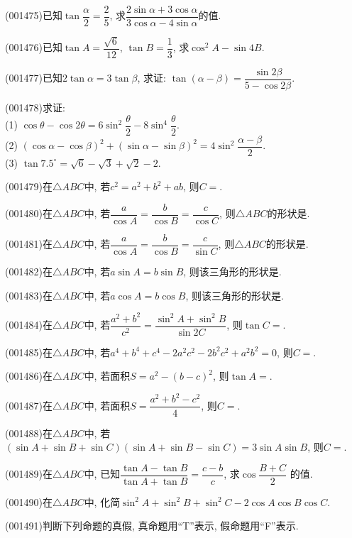 \item (001475)已知$\tan \dfrac{\alpha}{2}=\dfrac{2}{5}$, 求$\dfrac{2\sin\alpha+3\cos\alpha}{3\cos\alpha-4\sin\alpha}$的值.
\item (001476)已知$\tan A=\dfrac{\sqrt{6}}{12}$, $\tan B=\dfrac{1}{3}$, 求$\cos^2 A-\sin 4B$.
\item (001477)已知$2\tan \alpha=3\tan \beta$, 求证: $\tan(\alpha-\beta)=\dfrac{\sin 2\beta}{5-\cos 2\beta}$.
\item (001478)求证:\\ 
(1) $\cos\theta-\cos 2\theta=6\sin^2\dfrac{\theta}{2}-8\sin^4\dfrac{\theta}{2}$.\\ 
(2) $(\cos\alpha-\cos\beta)^2+(\sin\alpha-\sin\beta)^2=4\sin^2\dfrac{\alpha-\beta}{2}$.\\ 
(3) $\tan 7.5^\circ=\sqrt{6}-\sqrt{3}+\sqrt{2}-2$.
\item (001479)在$\triangle ABC$中, 若$c^2=a^2+b^2+ab$, 则$C=$.
\item (001480)在$\triangle ABC$中, 若$\dfrac{a}{\cos A}=\dfrac{b}{\cos B}=\dfrac{c}{\cos C}$, 则$\triangle ABC$的形状是.
\item (001481)在$\triangle ABC$中, 若$\dfrac{a}{\cos A}=\dfrac{b}{\cos B}=\dfrac{c}{\sin C}$, 则$\triangle ABC$的形状是.
\item (001482)在$\triangle ABC$中, 若$a\sin A=b\sin B$, 则该三角形的形状是.
\item (001483)在$\triangle ABC$中, 若$a\cos A=b\cos B$, 则该三角形的形状是.
\item (001484)在$\triangle ABC$中, 若$\dfrac{a^2+b^2}{c^2}=\dfrac{\sin^2A+\sin^2B}{\sin 2C}$, 则$\tan C=$.
\item (001485)在$\triangle ABC$中, 若$a^4+b^4+c^4-2a^2c^2-2b^2c^2+a^2b^2=0$, 则$C=$.
\item (001486)在$\triangle ABC$中, 若面积$S=a^2-(b-c)^2$, 则$\tan A=$.
\item (001487)在$\triangle ABC$中, 若面积$S=\dfrac{a^2+b^2-c^2}{4}$, 则$C=$.
\item (001488)在$\triangle ABC$中, 若$(\sin A+\sin B+\sin C)(\sin A+\sin B-\sin C)=3\sin A\sin B$, 则$C=$.
\item (001489)在$\triangle ABC$中, 已知$\dfrac{\tan A-\tan B}{\tan A+\tan B}=\dfrac{c-b}{c}$,
求$\cos\dfrac{B+C}{2}$ 的值.
\item (001490)在$\triangle ABC$中, 化简$\sin^2 A+\sin^2 B+\sin^2 C-2\cos A\cos B\cos C$.
\item (001491)判断下列命题的真假, 真命题用``{\rm T}''表示, 假命题用``{\rm F}''表示.\\ 
